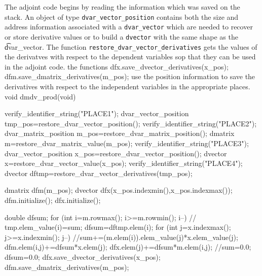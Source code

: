 The adjoint code begins by reading the information which was saved on the stack.
An object of type {\tt dvar\_vector\_position} contains both the size and
address information associated with a {\tt dvar\_vector} which are needed to
recover or store derivative values or to build a {\tt dvector} with the
same shape as the {\t dvar\_vector}.
The function {\tt restore\_dvar\_vector\_derivatives} gets the values of the
derivatves with respect to the dependent variables sop that they can be used in the
adjoint code. the functions
\beginexample
   dfx.save_dvector_derivatives(x_pos);
   dfm.save_dmatrix_derivatives(m_pos);
\endexample
\noindent use the position information to save the derivatives with respect to the
independent variables in the appropriate places.
\beginexample
void dmdv_prod(void)
{
  verify_identifier_string("PLACE1");
  dvar_vector_position tmp_pos=restore_dvar_vector_position();
  verify_identifier_string("PLACE2");
  dvar_matrix_position m_pos=restore_dvar_matrix_position();
  dmatrix m=restore_dvar_matrix_value(m_pos);
  verify_identifier_string("PLACE3");
  dvar_vector_position x_pos=restore_dvar_vector_position();
  dvector x=restore_dvar_vector_value(x_pos);
  verify_identifier_string("PLACE4");
  dvector dftmp=restore_dvar_vector_derivatives(tmp_pos);
  
  dmatrix dfm(m_pos);
  dvector dfx(x_pos.indexmin(),x_pos.indexmax());
  dfm.initialize();
  dfx.initialize();
  
   double dfsum;
   for (int i=m.rowmax(); i>=m.rowmin(); i--)
   {
     // tmp.elem_value(i)=sum;
     dfsum=dftmp.elem(i);
     for (int j=x.indexmax(); j>=x.indexmin(); j--)
     {
       //sum+=(m.elem(i)).elem_value(j)*x.elem_value(j);
       dfm.elem(i,j)+=dfsum*x.elem(j);
       dfx.elem(j)+=dfsum*m.elem(i,j);
     }
     //sum=0.0;
     dfsum=0.0;
   }
   dfx.save_dvector_derivatives(x_pos);
   dfm.save_dmatrix_derivatives(m_pos);
}
\endexample

